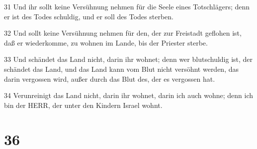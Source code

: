 \par 31 Und ihr sollt keine Versühnung nehmen für die Seele eines Totschlägers; denn er ist des Todes schuldig, und er soll des Todes sterben.
\par 32 Und sollt keine Versühnung nehmen für den, der zur Freistadt geflohen ist, daß er wiederkomme, zu wohnen im Lande, bis der Priester sterbe.
\par 33 Und schändet das Land nicht, darin ihr wohnet; denn wer blutschuldig ist, der schändet das Land, und das Land kann vom Blut nicht versöhnt werden, das darin vergossen wird, außer durch das Blut des, der es vergossen hat.
\par 34 Verunreinigt das Land nicht, darin ihr wohnet, darin ich auch wohne; denn ich bin der HERR, der unter den Kindern Israel wohnt.

\chapter{36}

